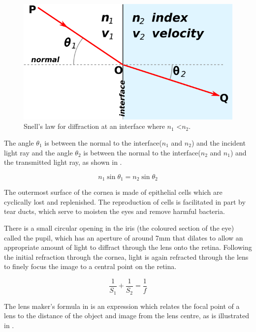 \begin{figure}[htbp]
 \centering
   \includegraphics{figures/snells}
 \caption{Snell's law for diffraction at an interface where $n_1$ \textless $n_2$.\cite{wikisnell}}
 \label{fig:snell}
\end{figure}

The angle $\theta_1$ is between the normal to the interface($n_1$ and $n_2$)
and the incident light ray and the angle $\theta_2$ is between the normal to
the interface($n_2$ and $n_1$) and the transmitted light ray, as shown in .

\begin{equation}
n_1\sin\theta_1=n_2\sin\theta_2
\label{eq:refractive}
\end{equation}

The outermost surface of the cornea is made of epithelial cells which
are cyclically lost and replenished.
\cite{jester1999cellular,hassell2010molecular} The reproduction
of cells is facilitated in part by tear ducts, which serve to
moisten the eyes and remove harmful bacteria.\cite{holly1977tear}

There is a small circular opening in the iris (the coloured section of
the eye) called the pupil, which has an aperture of around 7mm that
dilates to allow an appropriate amount of light to diffract through
the lens onto the retina.\cite{krugman1964some} Following the initial
refraction through the cornea, light is again refracted through the lens
to finely focus the image to a central point on the retina.

\begin{equation}
\frac{1}{S_1} + \frac{1}{S_2} = \frac{1}{f}
\label{eq:lens_makers}
\end{equation}

The lens maker’s formula in  is an expression which relates the
focal point of a lens to the distance of the object and image from the lens centre,
as is illustrated in .

